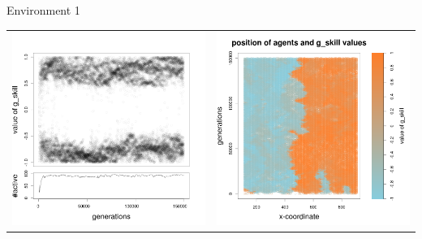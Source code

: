 \documentclass[8pt, handout=show,notes=show]{beamer}
\begin{document}
\begin{frame}{Environment 1}
\begin{table}[H]
\begin{tabular}{cc}
\newline
\includegraphics[width=\imgSize]{../images/5StaticEnv/Gplot66_staticEnv1}&\includegraphics[width=\imgSize]{../images/5StaticEnv/Gplot66Static_staticEnv1}\\
\end{tabular}

\end{table}
\end{frame}
\end{document}
